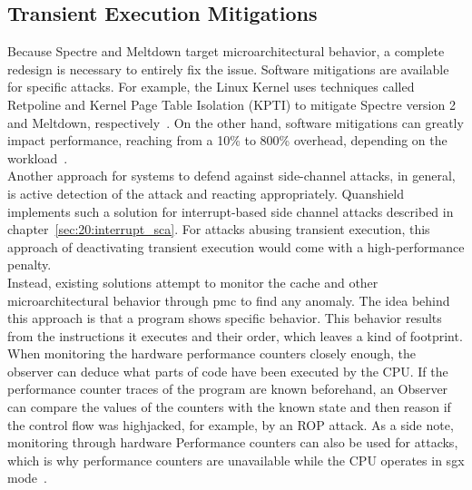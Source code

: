 \subsection{Transient Execution Mitigations}
\label{sec:20:def_sca}
Because Spectre and Meltdown target microarchitectural behavior, a complete
redesign is necessary to entirely fix the issue. Software mitigations are
available for specific attacks. For example, the Linux Kernel uses techniques
called Retpoline and Kernel Page Table Isolation (KPTI) to mitigate Spectre
version 2 and Meltdown, respectively~\cite{retpoline}. On the other hand,
software mitigations can greatly impact performance, reaching from a 10\% to
800\% overhead, depending on the workload~\cite{low2018overview}.\\

Another approach for systems to defend against side-channel attacks, in general,
is active detection of the attack and reacting appropriately. Quanshield
implements such a solution for interrupt-based side channel attacks described in
chapter~\ref{sec:20:interrupt_sca}. For attacks abusing transient execution,
this approach of deactivating transient execution would come with a
high-performance penalty.\\

Instead, existing solutions attempt to monitor the cache and other
microarchitectural behavior through \gls{pmc} to find any anomaly. The idea
behind this approach is that a program shows specific behavior. This behavior
results from the instructions it executes and their order, which leaves a kind
of footprint. When monitoring the hardware performance counters closely enough,
the observer can deduce what parts of code have been executed by the CPU. If the
performance counter traces of the program are known beforehand, an Observer can
compare the values of the counters with the known state and then reason if the
control flow was highjacked, for example, by an ROP attack. As a side note,
monitoring through hardware Performance counters can also be used for attacks,
which is why performance counters are unavailable while the CPU operates in
\gls{sgx} mode~\cite{uhsadel2008exploiting,costan2016intel}.\\


